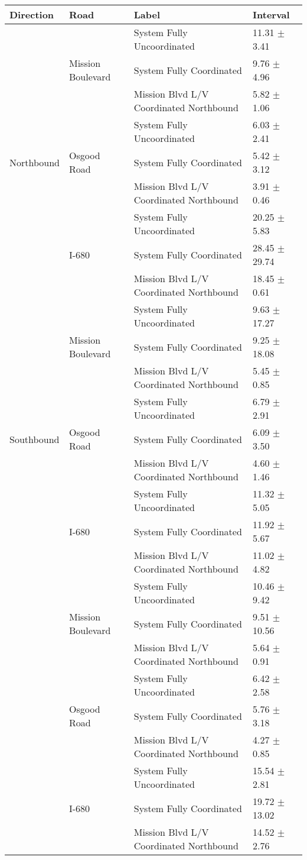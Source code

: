 \begin{tabular}{llll}
\toprule
Direction & Road & Label & Interval \\
\midrule
\multirow[t]{9}{*}{Northbound} & \multirow[t]{3}{*}{Mission Boulevard} & System Fully Uncoordinated & 11.31 $\pm$ 3.41 \\
 &  & System Fully Coordinated & 9.76 $\pm$ 4.96 \\
 &  & Mission Blvd L/V Coordinated Northbound & 5.82 $\pm$ 1.06 \\
 & \multirow[t]{3}{*}{Osgood Road} & System Fully Uncoordinated & 6.03 $\pm$ 2.41 \\
 &  & System Fully Coordinated & 5.42 $\pm$ 3.12 \\
 &  & Mission Blvd L/V Coordinated Northbound & 3.91 $\pm$ 0.46 \\
 & \multirow[t]{3}{*}{I-680} & System Fully Uncoordinated & 20.25 $\pm$ 5.83 \\
 &  & System Fully Coordinated & 28.45 $\pm$ 29.74 \\
 &  & Mission Blvd L/V Coordinated Northbound & 18.45 $\pm$ 0.61 \\
\multirow[t]{9}{*}{Southbound} & \multirow[t]{3}{*}{Mission Boulevard} & System Fully Uncoordinated & 9.63 $\pm$ 17.27 \\
 &  & System Fully Coordinated & 9.25 $\pm$ 18.08 \\
 &  & Mission Blvd L/V Coordinated Northbound & 5.45 $\pm$ 0.85 \\
 & \multirow[t]{3}{*}{Osgood Road} & System Fully Uncoordinated & 6.79 $\pm$ 2.91 \\
 &  & System Fully Coordinated & 6.09 $\pm$ 3.50 \\
 &  & Mission Blvd L/V Coordinated Northbound & 4.60 $\pm$ 1.46 \\
 & \multirow[t]{3}{*}{I-680} & System Fully Uncoordinated & 11.32 $\pm$ 5.05 \\
 &  & System Fully Coordinated & 11.92 $\pm$ 5.67 \\
 &  & Mission Blvd L/V Coordinated Northbound & 11.02 $\pm$ 4.82 \\
\multirow[t]{9}{*}{} & \multirow[t]{3}{*}{Mission Boulevard} & System Fully Uncoordinated & 10.46 $\pm$ 9.42 \\
 &  & System Fully Coordinated & 9.51 $\pm$ 10.56 \\
 &  & Mission Blvd L/V Coordinated Northbound & 5.64 $\pm$ 0.91 \\
 & \multirow[t]{3}{*}{Osgood Road} & System Fully Uncoordinated & 6.42 $\pm$ 2.58 \\
 &  & System Fully Coordinated & 5.76 $\pm$ 3.18 \\
 &  & Mission Blvd L/V Coordinated Northbound & 4.27 $\pm$ 0.85 \\
 & \multirow[t]{3}{*}{I-680} & System Fully Uncoordinated & 15.54 $\pm$ 2.81 \\
 &  & System Fully Coordinated & 19.72 $\pm$ 13.02 \\
 &  & Mission Blvd L/V Coordinated Northbound & 14.52 $\pm$ 2.76 \\
\bottomrule
\end{tabular}
